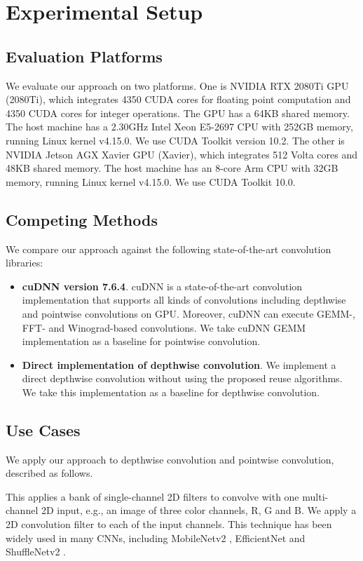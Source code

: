 

\section{Experimental Setup}

\subsection{Evaluation Platforms} We evaluate our approach on two platforms. 
One is NVIDIA RTX 2080Ti GPU (2080Ti), which integrates 4350 CUDA cores for floating point computation and 4350 CUDA cores for integer operations. 
The GPU has a 64KB shared memory. 
The host machine has a 2.30GHz Intel Xeon E5-2697 CPU with 252GB memory, running Linux kernel v4.15.0. We use CUDA Toolkit version 10.2.
The other is NVIDIA Jetson AGX Xavier GPU (Xavier), which integrates 512 Volta cores and 48KB shared memory.
The host machine has an 8-core Arm CPU with 32GB memory, running Linux kernel v4.15.0. We use CUDA Toolkit 10.0. 


\subsection{Competing Methods} We compare our approach against the following state-of-the-art convolution libraries:
\begin{itemize}
  \item \textbf{cuDNN version 7.6.4}. cuDNN is a state-of-the-art convolution implementation that supports all kinds of convolutions including depthwise and pointwise convolutions on GPU. 
  Moreover, cuDNN can execute GEMM-, FFT- and Winograd-based convolutions. We take cuDNN GEMM implementation as a baseline for pointwise convolution.
  \item \textbf{Direct implementation of depthwise convolution}. We implement a direct depthwise convolution without using the proposed reuse algorithms. We take this implementation as a baseline for depthwise convolution.
\end{itemize}

\subsection{Use Cases}
We apply our approach to depthwise convolution and pointwise convolution, described as follows.

 This applies a bank of single-channel 2D filters to convolve with one multi-channel 2D input, e.g., an image of three color channels, R, G and B. We apply a 2D convolution filter to each of the input channels. 
This technique has been widely used in many CNNs, including MobileNetv2 \cite{Sandler_2018_CVPR}, EfficientNet \cite{tan2019efficientnet} and ShuffleNetv2 \cite{Ma_2018_ECCV}.

